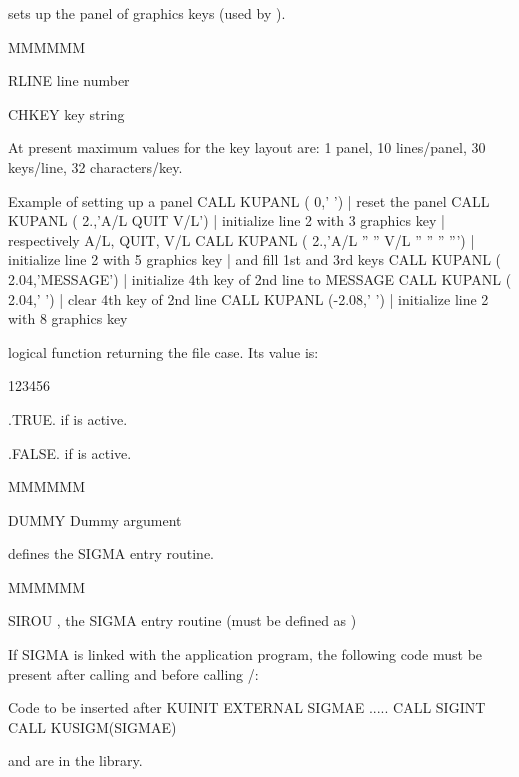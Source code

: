 \Action sets up the panel of graphics keys (used by ).
\Pdesc\begin{DLtt}{MMMMMM}
\item[RLINE] line number
\item[CHKEY] key string
\end{DLtt}
At present maximum values for the key layout are:
1 panel, 10 lines/panel, 30 keys/line, 32 characters/key.

\begin{XMPt}{Example of setting up a panel}
CALL KUPANL ( 0,' ')              | reset the panel
CALL KUPANL ( 2.,'A/L QUIT V/L')  | initialize line 2 with 3 graphics key
                                  | respectively A/L, QUIT, V/L
CALL KUPANL ( 2.,'A/L '' ''  V/L '' '' '' ''')
                                  | initialize line 2 with 5 graphics key
                                  |  and fill 1st and 3rd keys
CALL KUPANL ( 2.04,'MESSAGE')     | initialize 4th key of 2nd line to MESSAGE
CALL KUPANL ( 2.04,' ')           | clear 4th key of 2nd line
CALL KUPANL (-2.08,' ')           | initialize line 2 with 8 graphics key
\end{XMPt}

\Action logical function returning the file case. Its value is:
\begin{DLtt}{123456}
\item[.TRUE.] if  is active.  
\item[.FALSE.] if  is active.
\end{DLtt} 
\Pdesc\begin{DLtt}{MMMMMM}
\item[DUMMY] Dummy argument
\end{DLtt}

\Action defines the SIGMA entry routine.
\Pdesc\begin{DLtt}{MMMMMM}
\item[SIROU] , the SIGMA 
entry routine (must be defined as )
\end{DLtt}

If SIGMA is linked with the \KUIP{} application program, the following code
must be present after calling  and before 
calling /:
\begin{XMP}{Code to be inserted after KUINIT}
      EXTERNAL SIGMAE
      .....
      CALL SIGINT
      CALL KUSIGM(SIGMAE)
\end{XMP}
 and  are in the \PAWLIB{} library.


